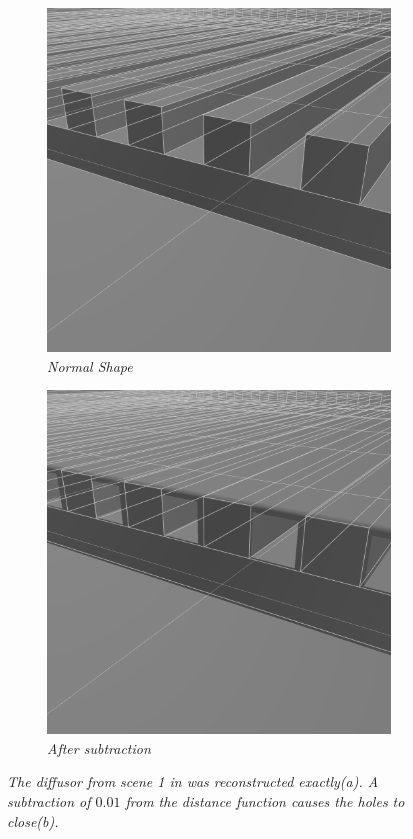 \documentclass[twoside,a4paper]{article}
\begin{document}
\begin{figure}[ht]
\centering
\begin{subfigure}{0.2\textwidth}
  \centering
  \includegraphics[width=0.9\linewidth]{img/diffusorNorm.png}
  \caption{\it Normal Shape}
  \label{fig:diffNorm}
\end{subfigure}%
\begin{subfigure}{0.2\textwidth}
  \centering
  \includegraphics[width=0.9\linewidth]{img/diffusorSmooth.png}
  \caption{\it After subtraction}
  \label{fig:sub2}
\end{subfigure}
\caption{\it The diffusor from scene 1 in \cite{brinkmann_round_2019} was reconstructed exactly(a). A subtraction of $0.01$ from the distance function causes the holes to close(b).}
\label{fig:diffSmooth}
\end{figure}
\end{document}
